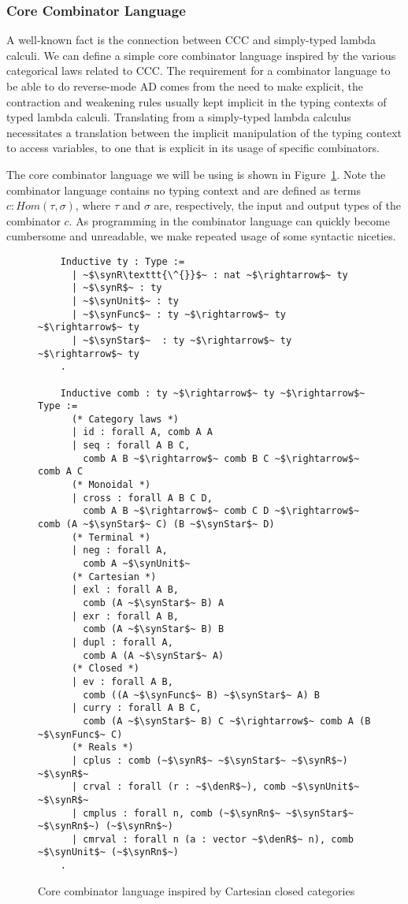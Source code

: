 \subsubsection{Core Combinator Language}\label{sec:combinator-core}
  A well-known fact is the connection between CCC and simply-typed lambda calculi\cite{10.1007/3-540-15198-2_10}.
  We can define a simple core combinator language inspired by the various categorical laws related to CCC.
  The requirement for a combinator language to be able to do reverse-mode AD comes from the need to make explicit, the contraction and weakening rules usually kept implicit in the typing contexts of typed lambda calculi.
  Translating from a simply-typed lambda calculus necessitates a translation between the implicit manipulation of the typing context to access variables, to one that is explicit in its usage of specific combinators.

  The core combinator language we will be using is shown in Figure~\ref{fig:combinator_core_lang}.
  Note the combinator language contains no typing context and are defined as terms $c : Hom(\tau, \sigma)$, where $\tau$ and $\sigma$ are, respectively, the input and output types of the combinator $c$.
  As programming in the combinator language can quickly become cumbersome and unreadable, we make repeated usage of some syntactic niceties.

  \begin{figure}[]
    \centering
    \begin{verbatim}
    Inductive ty : Type :=
      | ~$\synR\texttt{\^{}}$~ : nat ~$\rightarrow$~ ty
      | ~$\synR$~ : ty
      | ~$\synUnit$~ : ty
      | ~$\synFunc$~ : ty ~$\rightarrow$~ ty ~$\rightarrow$~ ty
      | ~$\synStar$~  : ty ~$\rightarrow$~ ty ~$\rightarrow$~ ty
    .

    Inductive comb : ty ~$\rightarrow$~ ty ~$\rightarrow$~ Type :=
      (* Category laws *)
      | id : forall A, comb A A
      | seq : forall A B C,
        comb A B ~$\rightarrow$~ comb B C ~$\rightarrow$~ comb A C
      (* Monoidal *)
      | cross : forall A B C D,
        comb A B ~$\rightarrow$~ comb C D ~$\rightarrow$~ comb (A ~$\synStar$~ C) (B ~$\synStar$~ D)
      (* Terminal *)
      | neg : forall A,
        comb A ~$\synUnit$~
      (* Cartesian *)
      | exl : forall A B,
        comb (A ~$\synStar$~ B) A
      | exr : forall A B,
        comb (A ~$\synStar$~ B) B
      | dupl : forall A,
        comb A (A ~$\synStar$~ A)
      (* Closed *)
      | ev : forall A B,
        comb ((A ~$\synFunc$~ B) ~$\synStar$~ A) B
      | curry : forall A B C,
        comb (A ~$\synStar$~ B) C ~$\rightarrow$~ comb A (B ~$\synFunc$~ C)
      (* Reals *)
      | cplus : comb (~$\synR$~ ~$\synStar$~ ~$\synR$~) ~$\synR$~
      | crval : forall (r : ~$\denR$~), comb ~$\synUnit$~ ~$\synR$~
      | cmplus : forall n, comb (~$\synRn$~ ~$\synStar$~ ~$\synRn$~) (~$\synRn$~)
      | cmrval : forall n (a : vector ~$\denR$~ n), comb ~$\synUnit$~ (~$\synRn$~)
    .
    \end{verbatim}
    \caption{Core combinator language inspired by Cartesian closed categories}
    \label{fig:combinator_core_lang}
  \end{figure}

